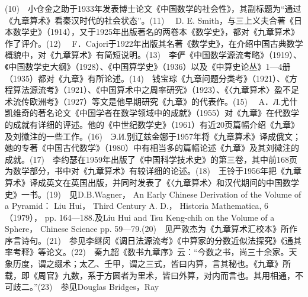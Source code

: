 \documentclass[12pt,UTF8]{ctexbook}
\begin{document}
(10)　小仓金之助于1933年发表博士论文《中国数学的社会性》，其副标题为“通过《九章算术》看秦汉时代的社会状态”。(11)　 D. E. Smith，与三上义夫合著《日本数学史》（1914），又于1925年出版著名的两卷本《数学史》，都对《九章算术》作了评介。(12)　 F．Cajori于1922年出版其名著《数学史》，在介绍中国古典数学概貌中，对《九章算术》有简短说明。(13)　李俨《中国数学源流考略》（1919）、《中国数学史大纲》（1928）、《中国算学史》（1936）以及《中算史论丛》1—4册（1935）都对《九章》有所论述。(14)　钱宝琮《九章问题分类考》（1921）、《方程算法源流考》（1921）、《中国算术中之周率研究》（1923）、《〈九章算术〉盈不足术流传欧洲考》（1927）等文是他早期研究《九章》的代表作。(15)　 A．Л.尤什凯维奇的著名论文《中国学者在数学领域中的成就》（1955）对《九章》在代数学的成就有详细的评述。他的《中世纪数学史》（1961）有近20页篇幅介绍《九章》及刘徽注的一些工作。(16)　Э.И.别辽兹金娜于1957年将《九章算术》译成俄文；她的专著《中国古代数学》（1980）中有相当多的篇幅论述《九章》及其刘徽注的成就。(17)　李约瑟在1959年出版了《中国科学技术史》的第三卷，其中前168页为数学部分，书中对《九章算术》有较详细的论述。(18)　王铃于1956年把《九章算术》译成英文在英国出版，并同时发表了《〈九章算术〉和汉代期间的中国数学史》一书。(19)　见D.B.Wagner， An Early Chinese Derivation of the Volume of a Pyramid： Liu Hui， Third Century A. D.， Historia Mathematica, 6（1979）， pp. 164—188.及Liu Hui and Tsu Keng-chih on the Volume of a Sphere， Chinese Science pp. 59—79.(20)　见严敦杰为《九章算术汇校本》所作序言诗句。(21)　参见李继闵《调日法源流考》《中算家的分数近似法探究》《通其率考释》等论文。(22)　秦九韶《数书九章序》云：“今数之书，尚三十余家。天象历度，谓之缀术；太乙、壬甲，谓之三式，皆曰内算，言其秘也。《九章》所载，即《周官》九数，系于方圆者为里术，皆曰外算，对内而言也。其用相通，不可歧二。”(23)　参见Douglas Bridges，Ray 
\end{document}
